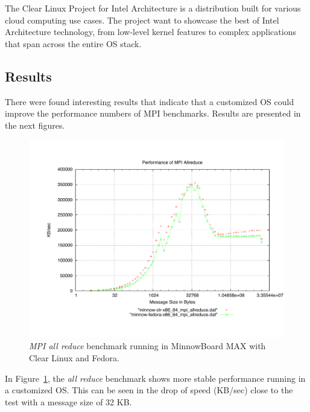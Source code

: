 The Clear Linux Project for Intel Architecture \cite{clear-linux} is a
distribution built for various cloud computing use cases. The project  want to showcase
the best of Intel Architecture technology, from low-level kernel features to
complex applications that span across the entire OS stack.

\subsection{Results}

There were found interesting results that indicate that a customized OS could 
improve the performance numbers of MPI benchmarks. Results are presented in the
next figures.

\begin{figure}[H]
\centering
\includegraphics[width=1 \textwidth]{images/mpbench_clr_experiments/mpi_allreduce.pdf}
\caption{\textit{MPI all reduce} benchmark running in MinnowBoard MAX with Clear Linux and
Fedora.}
\label{mpi_allreduce_clr_fedora}
\end{figure}

In Figure~\ref{mpi_allreduce_clr_fedora}, the \textit{all reduce} benchmark
shows more stable performance running in a customized OS. This can be seen in
the drop of speed (KB/sec) close to the test with a message size of 32 KB. 

